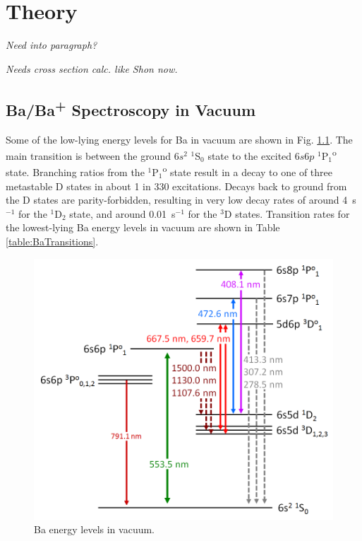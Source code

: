 \chapter{Theory}


\emph{\color{gray}Need into paragraph?}

\emph{\color{gray}Needs cross section calc. like Shon now.}

\section{Ba/Ba\textsuperscript{+} Spectroscopy in Vacuum}
\label{sec:vacuum}

Some of the low-lying energy levels for Ba in vacuum are shown in Fig. \ref{fig:elevsBa}.  The main transition is between the ground $6s^{2}$ $^{1}$S$_{0}$ state to the excited $6s6p$ $^{1}$P$_{1}$\textsuperscript{o} state.  Branching ratios from the $^{1}$P$_{1}$\textsuperscript{o} state result in a decay to one of three metastable D states in about 1 in 330 excitations.  Decays back to ground from the D states are parity-forbidden, resulting in very low decay rates of around 4~s$^{-1}$ for the $^{1}$D$_{2}$ state, and around 0.01~s$^{-1}$ for the $^{3}$D states.  Transition rates for the lowest-lying Ba energy levels in vacuum are shown in Table \ref{table:BaTransitions}.


\begin{figure} %
	\includegraphics[width=.8\textwidth]{figures/elevs_Ba_extra_with3P1.png}
	\caption{Ba energy levels in vacuum.}
    \label{fig:elevsBa}
\end{figure}

